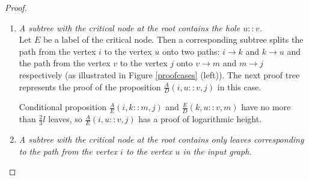 \begin{proof}
\begin{enumerate}
\item \textit{A subtree with the critical node at the root contains the hole $u :: v$.} 
\\ Let $E$ be a label of the critical node. Then a corresponding subtree splits the path from the vertex $i$ to the vertex $u$ onto two paths: $i \rightarrow k$ and $k \rightarrow u$ and the path from the vertex $v$ to the vertex $j$ onto $v \rightarrow m$ and $m \rightarrow j$ respectively (as illustrated in Figure \ref{proofcases} (left)). The next proof tree represents the proof of the proposition $\frac{A}{D}(i , u ::v, j)$ in this case. 
\begin{prooftree}
\end{prooftree}
Conditional proposition $\frac{A}{E}(i , k :: m , j)$ and $\frac{E}{D}(k , u :: v , m)$ have no more than $\frac{2}{3}l$ leaves, so $\frac{A}{E}(i , u :: v , j)$ has a proof of logarithmic height.

\item \textit{A subtree with the critical node at the root contains only leaves corresponding to the path from the vertex $i$ to the vertex $u$ in the input graph.}



\end{enumerate}
\end{proof}
